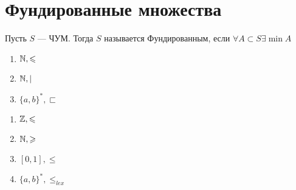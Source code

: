 \section{Фундированные множества}
\begin{definition}
    Пусть \(S\) --- ЧУМ. Тогда \(S\) называется Фундированным, если \(\forall A \subset S \exists \min A\)
\end{definition}
\begin{example}[Фундированные]\indent
    \begin{enumerate}
        \item \(\mathbb{N}, \leqslant\)
        \item \(\mathbb{N}, |\)
        \item \(\{a, b\}^*, \sqsubset \)
    \end{enumerate}
\end{example}
\begin{example}[Не фундированные]\indent
    \begin{enumerate}
        \item \(\mathbb{Z}, \leqslant\)
        \item \(\mathbb{N}, \geqslant\)
        \item \([0, 1], \le \)
        \item \(\{a, b\}^*, \le_{lex} \)
    \end{enumerate}
\end{example}

